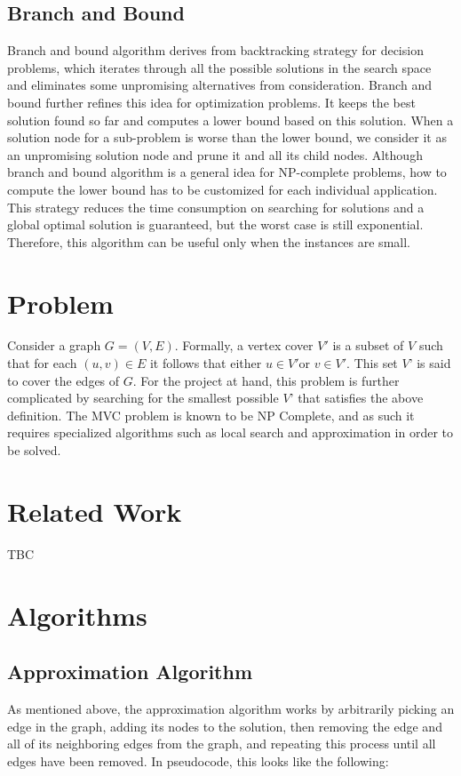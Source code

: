 \subsection{Branch and Bound}
Branch and bound algorithm derives from backtracking strategy for decision problems, which iterates through all the possible solutions in the search space and eliminates some unpromising alternatives from consideration. Branch and bound further refines this idea for optimization problems. It keeps the best solution found so far and computes a lower bound based on this solution. When a solution node for a sub-problem is worse than the lower bound, we consider it as an unpromising solution node and prune it and all its child nodes. Although branch and bound algorithm is a general idea for NP-complete problems, how to compute the lower bound has to be customized for each individual application. This strategy reduces the time consumption on searching for solutions and a global optimal solution is guaranteed, but the worst case is still exponential. Therefore, this algorithm can be useful only when the instances are small.

\section{Problem}
Consider a graph $G=\left( V,E \right)$.  Formally, a vertex cover ${V}'$ is a subset of $V$ such that for each $\left( u,v \right)\in E$ it follows that either $u\in{V}'$or $v\in{V}'$. This set ${V}’$ is said to cover the edges of $G$. For the project at hand, this problem is further complicated by searching for the smallest possible ${V}’$ that satisfies the above definition. The MVC problem is known to be NP Complete, and as such it requires specialized algorithms such as local search and approximation in order to be solved. 

\section{Related Work}
TBC
\section{Algorithms}
\subsection{Approximation Algorithm}
As mentioned above, the approximation algorithm works by arbitrarily picking an edge in the graph, adding its nodes to the solution, then removing the edge and all of its neighboring edges from the graph, and repeating this process until all edges have been removed. In pseudocode, this looks like the following:

